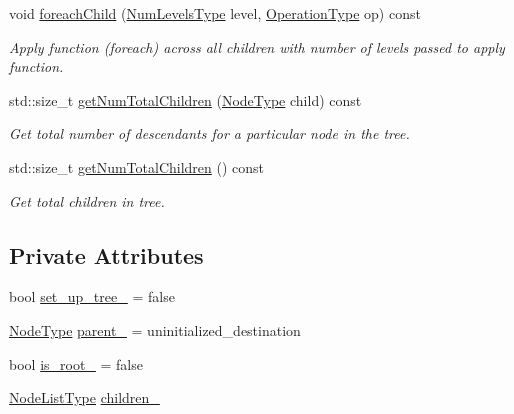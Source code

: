 \begin{DoxyCompactItemize}
void \hyperlink{structvt_1_1collective_1_1tree_1_1_tree_a8200f03bf19b18b2323d1fcb99d5335f}{foreach\+Child} (\hyperlink{structvt_1_1collective_1_1tree_1_1_tree_af64acc9543dc1bd1b56d6ed17b003425}{Num\+Levels\+Type} level, \hyperlink{structvt_1_1collective_1_1tree_1_1_tree_a5ce4242e9580c807baa74168401f381a}{Operation\+Type} op) const
\begin{DoxyCompactList}\small\item\em Apply function (foreach) across all children with number of levels passed to apply function. \end{DoxyCompactList}\item 
std\+::size\+\_\+t \hyperlink{structvt_1_1collective_1_1tree_1_1_tree_ac387d211dbc2689a216a3b99bc332507}{get\+Num\+Total\+Children} (\hyperlink{namespacevt_a866da9d0efc19c0a1ce79e9e492f47e2}{Node\+Type} child) const
\begin{DoxyCompactList}\small\item\em Get total number of descendants for a particular node in the tree. \end{DoxyCompactList}\item 
std\+::size\+\_\+t \hyperlink{structvt_1_1collective_1_1tree_1_1_tree_a294b7827285c140d412a4344f3b135d5}{get\+Num\+Total\+Children} () const
\begin{DoxyCompactList}\small\item\em Get total children in tree. \end{DoxyCompactList}\end{DoxyCompactItemize}
\subsection*{Private Attributes}
\begin{DoxyCompactItemize}
\item 
bool \hyperlink{structvt_1_1collective_1_1tree_1_1_tree_af240b20228198eae21c33e1b6a042fe2}{set\+\_\+up\+\_\+tree\+\_\+} = false
\item 
\hyperlink{namespacevt_a866da9d0efc19c0a1ce79e9e492f47e2}{Node\+Type} \hyperlink{structvt_1_1collective_1_1tree_1_1_tree_a9984c66b641a7a3ea9db6afc686739b0}{parent\+\_\+} = uninitialized\+\_\+destination
\item 
bool \hyperlink{structvt_1_1collective_1_1tree_1_1_tree_abe6e5a200fc08f3dc040bd134e97d8f2}{is\+\_\+root\+\_\+} = false
\item 
\hyperlink{structvt_1_1collective_1_1tree_1_1_tree_a834e7b54ea2dceae42db7c5ea859753f}{Node\+List\+Type} \hyperlink{structvt_1_1collective_1_1tree_1_1_tree_ad4485d4ba90addf6bd7e25425d4cf6dd}{children\+\_\+}
\end{DoxyCompactItemize}


